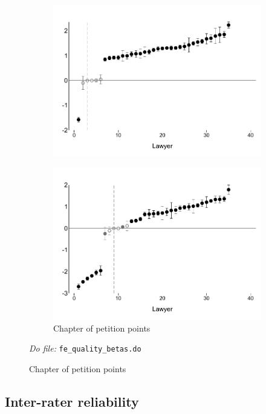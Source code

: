 \documentclass[oneside,11pt]{article}
\begin{document}
\begin{figure}[H]
\begin{center}
\begin{subfigure}{0.49\textwidth}
        \includegraphics[width=\textwidth]{Figuras/betasp3_ql_calif_derechos.pdf}
    \end{subfigure}    
 \begin{subfigure}{0.49\textwidth}
        \caption{Chapter of petition points}
        \centering
        \includegraphics[width=\textwidth]{Figuras/betasp3_ql_calif_puntos_petitorios.pdf}
    \end{subfigure}      
    \end{center}
    \scriptsize{ \noindent 
    \textit{Do file: }  \texttt{fe\_quality\_betas.do}}

\end{figure}




\subsection{Inter-rater reliability}
\end{document}
